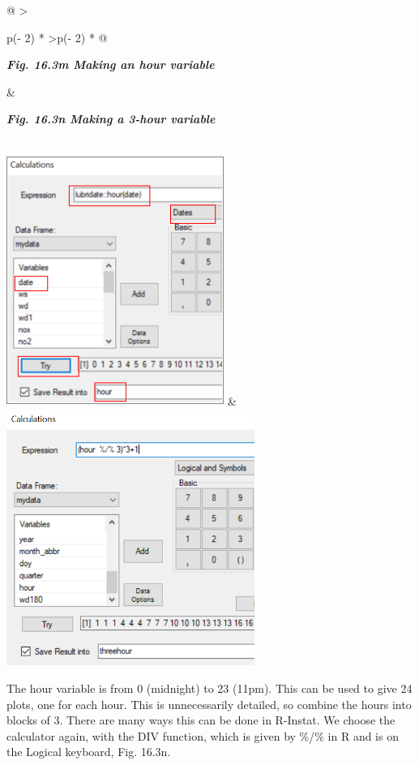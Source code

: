 \documentclass[
  letterpaper,
  DIV=11,
  numbers=noendperiod]{scrreprt}
\begin{document}
\begin{longtable}[]{@{}
  >{\raggedright\arraybackslash}p{(\columnwidth - 2\tabcolsep) * }
  >{\raggedleft\arraybackslash}p{(\columnwidth - 2\tabcolsep) * }@{}}
\toprule\noalign{}
\begin{minipage}[b]{\linewidth}\raggedright
\textbf{\emph{Fig. 16.3m Making an hour variable}}
\end{minipage} & \begin{minipage}[b]{\linewidth}\raggedleft
\textbf{\emph{Fig. 16.3n Making a 3-hour variable}}
\end{minipage} \\
\midrule\noalign{}
\endhead
\bottomrule\noalign{}
\endlastfoot
\includegraphics[width=2.79402in,height=3.22341in]{figures/Fig16.3m.png}
&
\includegraphics[width=3.19143in,height=3.28906in]{figures/Fig16.3n.png} \\
\end{longtable}

The hour variable is from 0 (midnight) to 23 (11pm). This can be used to
give 24 plots, one for each hour. This is unnecessarily detailed, so
combine the hours into blocks of 3. There are many ways this can be done
in R-Instat. We choose the calculator again, with the DIV function,
which is given by \%/\% in R and is on the Logical keyboard, Fig. 16.3n.
\end{document}
